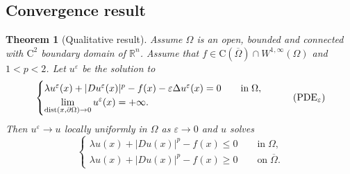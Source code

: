 \documentclass[11pt,reqno]{amsart}
\numberwithin{figure}{section}
\theoremstyle{plain}
\newtheorem{thm}{Theorem}[section]
\theoremstyle{remark}
\numberwithin{equation}{section}
\begin{document}
\subsection{Convergence result}
\begin{thm}[Qualitative result] Assume $\Omega$ is an open, bounded and connected with $\mathrm{C}^2$ boundary domain of $\mathbb{R}^n$. Assume that $f\in \mathrm{C}(\overline{\Omega})\cap W^{1,\infty}(\Omega)$ and $1<p<2$. Let $u^\varepsilon$ be the solution to 
\begin{equation}\label{eq:PDE}
    \begin{cases}
    \lambda u^\varepsilon(x) + |Du^\varepsilon(x)|^p - f(x) - \varepsilon \Delta u^\varepsilon(x) = 0 \qquad
    \text{in}\;\Omega, \vspace{0cm}\\
    \displaystyle  \lim_{\mathrm{dist}(x,\partial \Omega)\to 0} u^\varepsilon(x) = +\infty.
    \end{cases} \tag{PDE$_\varepsilon$}
\end{equation}
Then $u^\varepsilon \rightarrow u$ locally uniformly in $\Omega$ as $\varepsilon\rightarrow 0$ and $u$ solves
\begin{equation}\label{eq:PDE0}
    \begin{cases}
    \lambda u(x) + |Du(x)|^p - f(x) \leq 0 \qquad\text{in}\;\Omega,\\
    \lambda u(x) + |Du(x)|^p - f(x) \geq 0 \qquad\text{on}\;\overline{\Omega}.
    \end{cases}\tag{PDE$_0$}   
\end{equation}
\end{thm}
\end{document}
